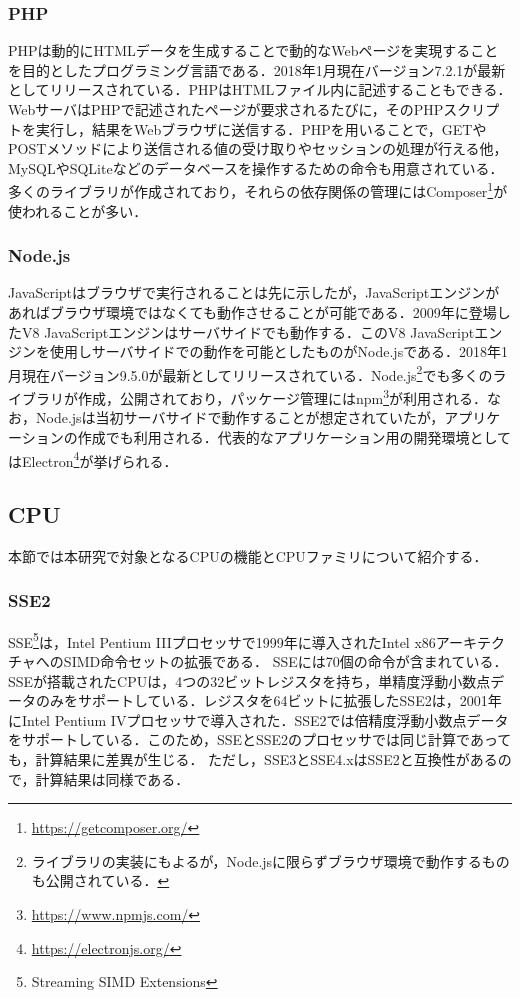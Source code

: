 \subsubsection{PHP}
PHPは動的にHTMLデータを生成することで動的なWebページを実現することを目的としたプログラミング言語である．2018年1月現在バージョン7.2.1が最新としてリリースされている．PHPはHTMLファイル内に記述することもできる．WebサーバはPHPで記述されたページが要求されるたびに，そのPHPスクリプトを実行し，結果をWebブラウザに送信する．PHPを用いることで，GETやPOSTメソッドにより送信される値の受け取りやセッションの処理が行える他，MySQLやSQLiteなどのデータベースを操作するための命令も用意されている．多くのライブラリが作成されており，それらの依存関係の管理にはComposer\footnote{\url{https://getcomposer.org/}}が使われることが多い．
\subsubsection{Node.js}
JavaScriptはブラウザで実行されることは先に示したが，JavaScriptエンジンがあればブラウザ環境ではなくても動作させることが可能である．2009年に登場したV8 JavaScriptエンジンはサーバサイドでも動作する．このV8 JavaScriptエンジンを使用しサーバサイドでの動作を可能としたものがNode.jsである．2018年1月現在バージョン9.5.0が最新としてリリースされている．Node.js\footnote{ライブラリの実装にもよるが，Node.jsに限らずブラウザ環境で動作するものも公開されている．}でも多くのライブラリが作成，公開されており，パッケージ管理にはnpm\footnote{\url{https://www.npmjs.com/}}が利用される．なお，Node.jsは当初サーバサイドで動作することが想定されていたが，アプリケーションの作成でも利用される．代表的なアプリケーション用の開発環境としてはElectron\footnote{\url{https://electronjs.org/}}が挙げられる．
\subsection{CPU}
本節では本研究で対象となるCPUの機能とCPUファミリについて紹介する．
\subsubsection{SSE2}
SSE\footnote{Streaming SIMD Extensions}は，Intel Pentium IIIプロセッサで1999年に導入されたIntel x86アーキテクチャへのSIMD命令セットの拡張である． SSEには70個の命令が含まれている．SSEが搭載されたCPUは，4つの32ビットレジスタを持ち，単精度浮動小数点データのみをサポートしている．レジスタを64ビットに拡張したSSE2は，2001年にIntel Pentium IVプロセッサで導入された．SSE2では倍精度浮動小数点データをサポートしている．このため，SSEとSSE2のプロセッサでは同じ計算であっても，計算結果に差異が生じる．
ただし，SSE3とSSE4.xはSSE2と互換性があるので，計算結果は同様である．

